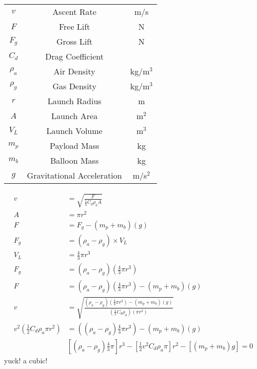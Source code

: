 \documentclass[12pt]{article}
\begin{document}
\begin{tabular}{c|c|c}
$v$ & Ascent Rate & m/s\\
$F$ & Free Lift & N\\
$F_g$ & Gross Lift & N\\
$C_d$ & Drag Coefficient &\\
$\rho_a$ & Air Density & kg/m$^3$\\
$\rho_g$ & Gas Density & kg/m$^3$\\
$r$ & Launch Radius & m\\
$A$ & Launch Area & m$^2$\\
$V_L$ & Launch Volume & m$^3$\\
$m_p$ & Payload Mass & kg\\
$m_b$ & Balloon Mass & kg\\
$g$ & Gravitational Acceleration & m/s$^2$\\
\end{tabular}
\newpage
\begin{align}
v &=\sqrt{\frac{F}{\frac{1}{2}C_d\rho_aA}}\\
A &=\pi r^2\\
F &=F_g - (m_p + m_b)(g)\\
F_g &= (\rho_a - \rho_g) \times V_L\\
V_L &= \frac{4}{3}\pi r^3\\
F_g &= (\rho_a - \rho_g)(\frac{4}{3}\pi r^3)\\
F &= (\rho_a - \rho_g)(\frac{4}{3}\pi r^3) - (m_p + m_b)(g)\\
v &= \sqrt{\frac
{(\rho_a - \rho_g)(\frac{4}{3}\pi r^3) - (m_p + m_b)(g)}
{(\frac{1}{2}C_d\rho_a)(\pi r^2)}}\\
v^2(\frac{1}{2}C_d\rho_a\pi r^2) &= ((\rho_a - \rho_g)\frac{4}{3}\pi r^3) -
(m_p + m_b)(g)\\
&[(\rho_a - \rho_g)\frac{4}{3}\pi]r^3 - [\frac{1}{2}v^2C_d\rho_a\pi]r^2 -
[(m_p + m_b)g] = 0
\end{align}
yuck! a cubic!
\end{document}
